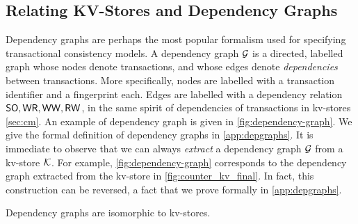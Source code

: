 \subsection{Relating KV-Stores and Dependency Graphs}
\label{sec:dep_graphs}
Dependency graphs \cite{adya-icde,adya} are perhaps the most popular 
formalism used for specifying transactional consistency models. 
A dependency graph $\mathcal{G}$ is a directed, labelled graph whose 
nodes denote transactions, and whose edges denote \emph{dependencies} between transactions.  
More specifically, nodes are labelled with a transaction identifier and a fingerprint each.
Edges are labelled with a dependency relation $\mathsf{SO}, \mathsf{WR}, \mathsf{WW}, \mathsf{RW}$, in the 
same spirit of dependencies of transactions in kv-stores \cref{sec:cm}.
An example of dependency graph is given in \cref{fig:dependency-graph}.
%
We give the formal definition of dependency graphs in \cref{app:depgraphs}.
It is immediate to observe that we can always \emph{extract} a dependency graph  $\mathcal{G}$ from a kv-store $\mathcal{K}$.
For example, \cref{fig:dependency-graph} corresponds to the dependency graph extracted from the kv-store in \cref{fig:counter_kv_final}.
In fact, this construction can be reversed, a fact that we prove formally in \cref{app:depgraphs}.
\begin{theorem}
\label{thm:kv_graph_isomorph}
Dependency graphs are isomorphic to kv-stores.
\end{theorem}

